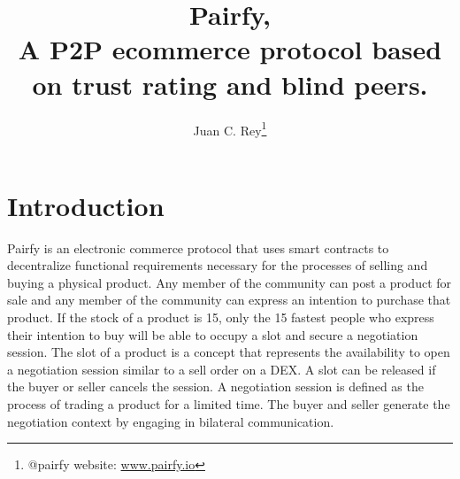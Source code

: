 \documentclass[12pt]{article}
\begin{document}
\title{\textbf{Pairfy,\\A P2P ecommerce protocol based on trust rating and blind peers. }}
\author{Juan C. Rey\footnote{@pairfy  website: \url{www.pairfy.io} }\\}


\maketitle

\renewcommand*\abstractname{\textbf{}\hfill}


\section{Introduction}

Pairfy is an electronic commerce protocol that uses smart contracts to decentralize functional requirements necessary for the processes of selling and buying a physical product.
Any member of the community can post a product for sale and any member of the community can express an intention to purchase that product.
If the stock of a product is 15, only the 15 fastest people who express their intention to buy will be able to occupy a slot and secure a negotiation session.
The slot of a product is a concept that represents the availability to open a negotiation session similar to a sell order on a DEX. A slot can be released if the buyer or seller cancels the session.
A negotiation session is defined as the process of trading a product for a limited time. The buyer and seller generate the negotiation context by engaging in bilateral communication.
\end{document}
